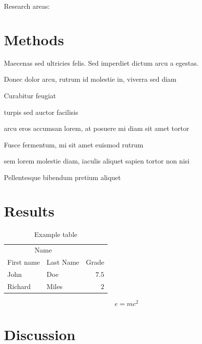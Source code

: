 \documentclass[twoside]{article}
\begin{document}
Research areas:



\section{Methods}

Maecenas sed ultricies felis. Sed imperdiet dictum arcu a egestas. 
\begin{compactitem}
\item Donec dolor arcu, rutrum id molestie in, viverra sed diam
\item Curabitur feugiat
\item turpis sed auctor facilisis
\item arcu eros accumsan lorem, at posuere mi diam sit amet tortor
\item Fusce fermentum, mi sit amet euismod rutrum
\item sem lorem molestie diam, iaculis aliquet sapien tortor non nisi
\item Pellentesque bibendum pretium aliquet
\end{compactitem}
\lipsum[4] %


\section{Results}

\begin{table}[H]
\caption{Example table}
\centering
\begin{tabular}{llr}
\toprule
\multicolumn{2}{c}{Name} \\
\cmidrule(r){1-2}
First name & Last Name & Grade \\
\midrule
John & Doe & $7.5$ \\
Richard & Miles & $2$ \\
\bottomrule
\end{tabular}
\end{table}

\lipsum[5] %

\begin{equation}
\label{eq:emc}
e = mc^2
\end{equation}

\lipsum[6] %


\section{Discussion}
\end{document}
